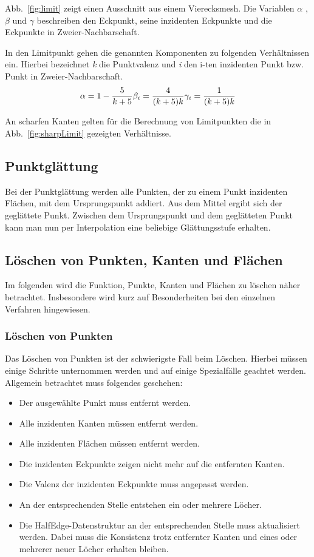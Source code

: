Abb.~\ref{fig:limit} zeigt einen Ausschnitt aus einem Vierecksmesh.
Die Variablen $\alpha$ , $\beta$ und $\gamma$ beschreiben den Eckpunkt, seine inzidenten Eckpunkte und die Eckpunkte in Zweier-Nachbarschaft.  

In den Limitpunkt gehen die genannten Komponenten zu folgenden Verhältnissen ein. Hierbei bezeichnet \emph{k} die Punktvalenz und \emph{i} den i-ten inzidenten Punkt bzw. Punkt in Zweier-Nachbarschaft.
\begin{equation}
\alpha = 1-\dfrac{5}{k+5}\\
\beta_i = \dfrac{4}{(k+5)k}\\
\gamma_i = \dfrac{1}{(k+5)k}
\end{equation}

An scharfen Kanten gelten für die Berechnung von Limitpunkten die in Abb.~\ref{fig:sharpLimit} gezeigten Verhältnisse.

\subsection{Punktglättung}
Bei der Punktglättung werden alle Punkten, der zu einem Punkt inzidenten Flächen, mit dem Ursprungspunkt addiert. 
Aus dem Mittel ergibt sich der geglättete Punkt. 
Zwischen dem Ursprungspunkt und dem geglätteten Punkt kann man nun per Interpolation eine beliebige Glättungsstufe erhalten.

\subsection{Löschen von Punkten, Kanten und Flächen}
Im folgenden wird die Funktion, Punkte, Kanten und Flächen zu löschen näher betrachtet.
Insbesondere wird kurz auf Besonderheiten bei den einzelnen Verfahren hingewiesen.
\subsubsection{Löschen von Punkten}
Das Löschen von Punkten ist der schwierigste Fall beim Löschen. Hierbei müssen einige Schritte unternommen werden und auf einige Spezialfälle geachtet werden. 
Allgemein betrachtet muss folgendes geschehen:
\begin{itemize}
\item Der ausgewählte Punkt muss entfernt werden.
\item Alle inzidenten Kanten müssen entfernt werden.
\item Alle inzidenten Flächen müssen entfernt werden.
\item Die inzidenten Eckpunkte zeigen nicht mehr auf die entfernten Kanten.
\item Die Valenz der inzidenten Eckpunkte muss angepasst werden.
\item An der entsprechenden Stelle entstehen ein oder mehrere Löcher.
\item Die HalfEdge-Datenstruktur an der entsprechenden Stelle muss aktualisiert werden. Dabei muss die Konsistenz trotz entfernter Kanten und eines oder mehrerer neuer Löcher erhalten bleiben.
\end{itemize}

